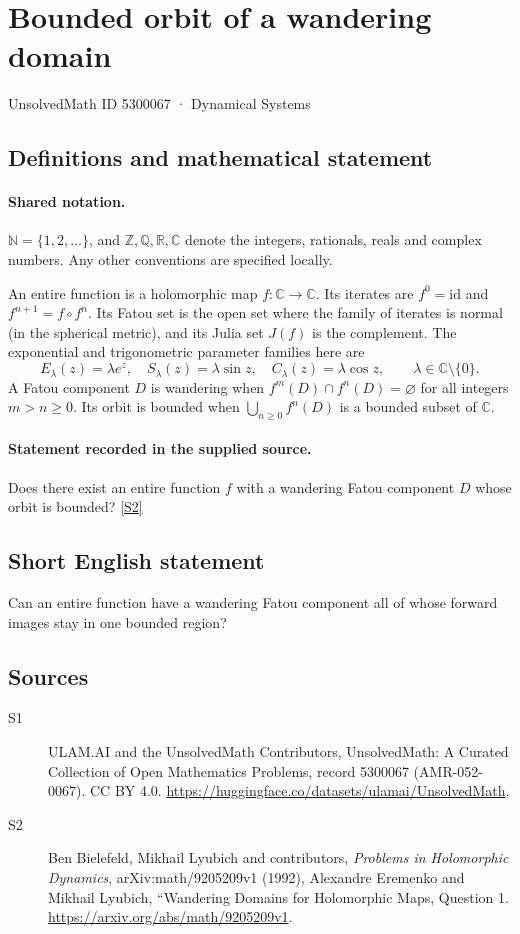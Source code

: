 \documentclass[11pt]{article}
\newcommand{\sref}[2]{\hyperlink{source:#1:#2}{[S#2]}}
\begin{document}
\setcounter{section}{5300066}
\section{Bounded orbit of a wandering domain}\label{5300067}
{\small\sffamily UnsolvedMath ID 5300067 · Dynamical Systems}
\subsection{Definitions and mathematical statement}

\paragraph{Shared notation.}$\mathbb N=\{1,2,\ldots\}$, and $\mathbb Z,\mathbb Q,\mathbb R,\mathbb C$ denote the integers, rationals, reals and complex numbers. Any other conventions are specified locally.


An entire function is a holomorphic map $f:\mathbb C\to\mathbb C$. Its iterates are $f^0=\mathrm{id}$ and $f^{n+1}=f\circ f^n$. Its Fatou set is the open set where the family of iterates is normal (in the spherical metric), and its Julia set $J(f)$ is the complement. The exponential and trigonometric parameter families here are
\[E_\lambda(z)=\lambda e^z,\quad S_\lambda(z)=\lambda\sin z,\quad C_\lambda(z)=\lambda\cos z,\qquad \lambda\in\mathbb C\setminus\{0\}.\]A Fatou component $D$ is wandering when $f^m(D)\cap f^n(D)=\varnothing$ for all integers $m>n\geq0$. Its orbit is bounded when $\bigcup_{n\geq0}f^n(D)$ is a bounded subset of $\mathbb C$.
\paragraph{Statement recorded in the supplied source.}
Does there exist an entire function $f$ with a wandering Fatou component $D$ whose orbit is bounded? \sref{5300067}{2}
\subsection{Short English statement}
Can an entire function have a wandering Fatou component all of whose forward images stay in one bounded region?
\subsection{Sources}
\begin{description}
\item[\hypertarget{source:5300067:1}{S1}] ULAM.AI and the UnsolvedMath Contributors, UnsolvedMath: A Curated Collection of Open Mathematics Problems, record 5300067 (AMR-052-0067). CC BY 4.0. \url{https://huggingface.co/datasets/ulamai/UnsolvedMath}.
\item[\hypertarget{source:5300067:2}{S2}] Ben Bielefeld, Mikhail Lyubich and contributors, \emph{Problems in Holomorphic Dynamics}, arXiv:math/9205209v1 (1992), Alexandre Eremenko and Mikhail Lyubich, ``Wandering Domains for Holomorphic Maps, Question 1. \url{https://arxiv.org/abs/math/9205209v1}.
\end{description}
\label{end:5300067}
\end{document}
